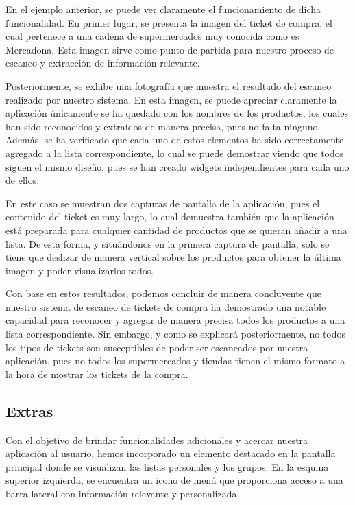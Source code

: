 \documentclass{article}
\begin{document}
En el ejemplo anterior, se puede ver claramente el funcionamiento de dicha funcionalidad. En primer lugar, se presenta la imagen del ticket de compra, el cual pertenece a una cadena de supermercados muy conocida como es Mercadona. Esta imagen sirve como punto de partida para nuestro proceso de escaneo y extracción de información relevante.

Posteriormente, se exhibe una fotografía que muestra el resultado del escaneo realizado por nuestro sistema. En esta imagen, se puede apreciar claramente la aplicación únicamente se ha quedado con los nombres de los productos, los cuales han sido reconocidos y extraídos de manera precisa, pues no falta ninguno. Además, se ha verificado que cada uno de estos elementos ha sido correctamente agregado a la lista correspondiente, lo cual se puede demostrar viendo que todos siguen el mismo diseño, pues se han creado widgets independientes para cada uno de ellos.

En este caso se muestran dos capturas de pantalla de la aplicación, pues el contenido del ticket es muy largo, lo cual demuestra también que la aplicación está preparada para cualquier cantidad de productos que se quieran añadir a una lista. De esta forma, y situándonos en la primera captura de pantalla, solo se tiene que deslizar de manera vertical sobre los productos para obtener la última imagen y poder visualizarlos todos.

Con base en estos resultados, podemos concluir de manera concluyente que nuestro sistema de escaneo de tickets de compra ha demostrado una notable capacidad para reconocer y agregar de manera precisa todos los productos a una lista correspondiente. Sin embargo, y como se explicará posteriormente, no todos los tipos de tickets son susceptibles de poder ser escaneados por nuestra aplicación, pues no todos los supermercados y tiendas tienen el mismo formato a la hora de mostrar los tickets de la compra.

\subsection{Extras}

Con el objetivo de brindar funcionalidades adicionales y acercar nuestra aplicación al usuario, hemos incorporado un elemento destacado en la pantalla principal donde se visualizan las listas personales y los grupos. En la esquina superior izquierda, se encuentra un icono de menú que proporciona acceso a una barra lateral con información relevante y personalizada.
\end{document}
